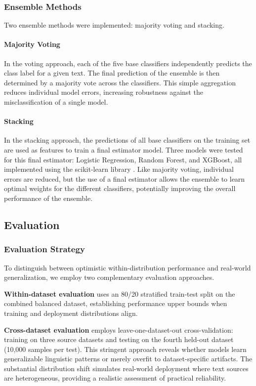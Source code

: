 \documentclass[11pt]{article}
\begin{document}
\subsubsection{Ensemble Methods}
\label{sec:ensemble-methods}
Two ensemble methods were implemented: majority voting and stacking.

\paragraph{Majority Voting}
In the voting approach, each of the five base classifiers independently predicts the class label for a given text. The final prediction of the ensemble is then determined by a majority vote across the classifiers. This simple aggregation reduces individual model errors, increasing robustness against the misclassification of a single model.

\paragraph{Stacking}
In the stacking approach, the predictions of all base classifiers on the training set are used as features to train a final estimator model. Three models were tested for this final estimator: Logistic Regression, Random Forest, and XGBoost, all implemented using the scikit-learn library \citep{scikit-learn}. Like majority voting, individual errors are reduced, but the use of a final estimator allows the ensemble to learn optimal weights for the different classifiers, potentially improving the overall performance of the ensemble. 


\subsection{Evaluation}
\label{sec:evaluation}

\subsubsection{Evaluation Strategy}
To distinguish between optimistic within-distribution performance and real-world generalization, we employ two complementary evaluation approaches.

\textbf{Within-dataset evaluation} uses an 80/20 stratified train-test split on the combined balanced dataset, establishing performance upper bounds when training and deployment distributions align.

\textbf{Cross-dataset evaluation} employs leave-one-dataset-out cross-validation: training on three source datasets and testing on the fourth held-out dataset (10,000 samples per test). This stringent approach reveals whether models learn generalizable linguistic patterns or merely overfit to dataset-specific artifacts. The substantial distribution shift simulates real-world deployment where text sources are heterogeneous, providing a realistic assessment of practical reliability.
\end{document}
